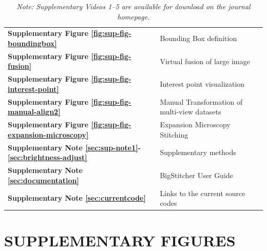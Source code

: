 \documentclass[]{spie}  %
\newcommand\tablespace{\vspace{2.5mm}}
\begin{document}
\begin{table}[h!]
{\begin{tabular}{lp{11cm}}
\textbf{Supplementary Figure \ref{fig:sup-fig-boundingbox}} & Bounding Box definition \tablespace \\
\textbf{Supplementary Figure \ref{fig:sup-fig-fusion}} & Virtual fusion of large image \tablespace \\
\textbf{Supplementary Figure \ref{fig:sup-fig-interest-point}} & Interest point visualization \tablespace \\
\textbf{Supplementary Figure \ref{fig:sup-fig-manual-align2}} & Manual Transformation of multi-view datasets \tablespace \\
\textbf{Supplementary Figure \ref{fig:sup-fig-expansion-microscopy}} & Expansion Microscopy Stitching \tablespace \\
\textbf{Supplementary Note \ref{sec:sup-note1}-\ref{sec:brightness-adjust}} & Supplementary methods \tablespace \\
\textbf{Supplementary Note \ref{sec:documentation}} & BigStitcher User Guide \tablespace \\
\textbf{Supplementary Note \ref{sec:currentcode}} & Links to the current source codes \tablespace \\

\end{tabular}}
\caption{\emph{Note: Supplementary Videos 1--5 are available for download on the journal homepage.}}
\end{table}

\pagebreak

\section*{SUPPLEMENTARY FIGURES}
\end{document}
